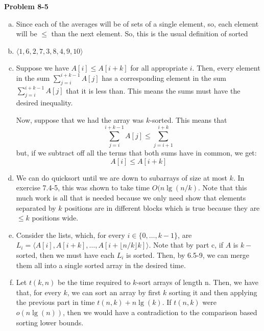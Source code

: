 \documentclass{article}
\begin{document}
\noindent\textbf{Problem 8-5}\\
\begin{enumerate}[a.]
\item
Since each of the averages will be of sets of a single element, so, each element will be $\le$ than the next element. So, this is the usual definition of sorted
\item
$\langle 1,6,2,7,3,8,4,9,10\rangle$
\item
Suppose we have $A[i] \le A[i+k]$ for all appropriate $i$. Then, every element in the sum $\sum_{j=i}^{i+k-1} A[j]$ has a corresponding element in the sum $\sum_{j=i}^{i+k-1} A[j]$ that it is less than. This means the sums must have the desired inequality.

Now, suppose that we had the array was $k$-sorted. This means that 
\[
\sum_{j=i}^{i+k-1} A[j] \le \sum_{j=i+1}^{i+k}
\] 
but, if we subtract off all the terms that both sums have in common, we get:
\[
A[i] \le A[i+k]
\]

\item
We can do quicksort until we are down to subarrays of size at most $k$. In exercise 7.4-5, this was shown to take time $O(n\lg(n/k)$. Note that this much work is all that is needed because we only need show that elements separated by $k$ positions are in different blocks which is true because they are $\le k$ positions wide.

\item
Consider the lists, which, for every $i\in\{0,\ldots,k-1\}$, are $L_i = \langle A[i],A[i+k], \ldots,A[i+ \lfloor n/k \rfloor k]\rangle$. Note that by  part c, if $A$ is $k-$ sorted, then we must have each $L_i$ is sorted. Then, by 6.5-9, we can merge them all into a single sorted array in the desired time.

\item
Let $t(k,n)$ be the time required to $k$-sort arrays of length n. Then, we have that, for every $k$, we can sort an array by first $k$ sorting it and then applying the previous part in time $t(n,k) +n \lg(k)$. If $t(n,k)$ were $o(n\lg(n))$, then we would have a contradiction to the comparison based sorting lower bounds.

\end{enumerate}
\end{document}
